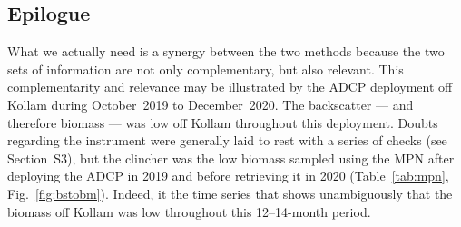\documentclass[authoryear,review,11pt]{elsarticle}
\begin{document}

\subsection{Epilogue}

What we actually need is a synergy between the two methods because the two sets of information are not only complementary, but also relevant.  This complementarity and relevance may be illustrated by the ADCP deployment off Kollam during October~2019 to December~2020. The backscatter --- and therefore biomass --- was low off Kollam throughout this deployment. Doubts regarding the instrument were generally laid to rest with a series of checks (see Section~S3), but the clincher was the low biomass sampled using the MPN after deploying the ADCP in 2019 and before retrieving it in 2020 (Table~\ref{tab:mpn}, Fig.~\ref{fig:bstobm}). Indeed, it the time series that shows unambiguously that the biomass off Kollam was low throughout this 12--14-month period.
\end{document}

